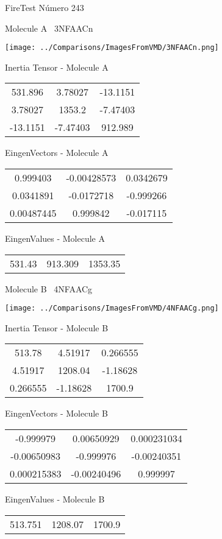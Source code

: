 \vtab[-3cm]
\begin{center}
{\large FireTest \tab Número 243}
\end{center}
\begin{multicols}{2}
\begin{center}

Molecule A \
3NFAACn

\texttt{[image: ../Comparisons/ImagesFromVMD/3NFAACn.png]}

Inertia Tensor - Molecule A \\
\begin{tabular}{|c c c|}
531.896	 & 	3.78027	 & 	-13.1151	 \\
3.78027	 & 	1353.2	 & 	-7.47403	 \\
-13.1151	 & 	-7.47403	 & 	912.989
\end{tabular}

\vtab
 EingenVectors - Molecule A     \\
\begin{tabular}{|c c c|}
0.999403	 & 	-0.00428573	 & 	0.0342679	 \\
0.0341891	 & 	-0.0172718	 & 	-0.999266	 \\
0.00487445	 & 	0.999842	 & 	-0.017115
\end{tabular}

\vtab
 EingenValues - Molecule A     \\
\begin{tabular}{|c c c|}
531.43	 & 	913.309	 & 	1353.35	 \\
\end{tabular}
\columnbreak

Molecule B \
4NFAACg

\texttt{[image: ../Comparisons/ImagesFromVMD/4NFAACg.png]}

Inertia Tensor - Molecule B \\
\begin{tabular}{|c c c|}
513.78	 & 	4.51917	 & 	0.266555	 \\
4.51917	 & 	1208.04	 & 	-1.18628	 \\
0.266555	 & 	-1.18628	 & 	1700.9
\end{tabular}

\vtab
 EingenVectors - Molecule B     \\
\begin{tabular}{|c c c|}
-0.999979	 & 	0.00650929	 & 	0.000231034	 \\
-0.00650983	 & 	-0.999976	 & 	-0.00240351	 \\
0.000215383	 & 	-0.00240496	 & 	0.999997
\end{tabular}

\vtab
 EingenValues - Molecule B     \\
\begin{tabular}{|c c c|}
513.751	 & 	1208.07	 & 	1700.9	 \\
\end{tabular}

\end{center}
\end{multicols}

